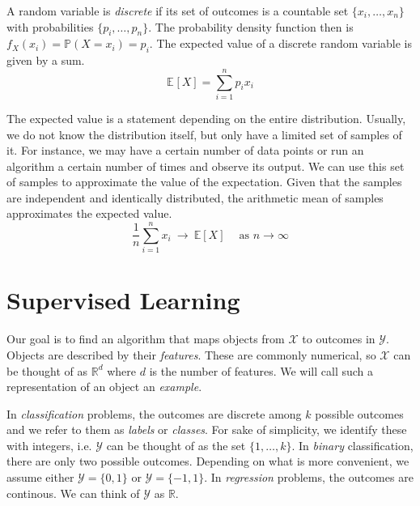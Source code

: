 \documentclass[
	twoside=false, %
]{kaobook}
\begin{document}
A random variable is \textit{discrete} if its set of outcomes is a countable set $\{ x_{i}, \dots, x_{n} \}$ with probabilities $\{ p_{i}, \dots, p_{n} \}$. The probability density function then is $f_X(x_i) = \mathbb{P}(X = x_i) = p_i$. The expected value of a discrete random variable is given by a sum.
$$
\mathbb{E}_{}\left[ X \right]  = \sum_{i=1}^n p_{i} x_{i}
$$

The expected value is a statement depending on the entire distribution. Usually, we do not know the distribution itself, but only have a limited set of samples of it. For instance, we may have a certain number of data points or run an algorithm a certain number of times and observe its output. We can use this set of samples to approximate the value of the expectation. Given that the samples are independent and identically distributed, the arithmetic mean of samples approximates the expected value.
$$
\frac{1}{n} \sum_{i=1}^n x_i ~ \rightarrow ~ \mathbb{E}\left[X\right]  ~ \hspace{1em} \text{as $n \to \infty$}
$$


\section{Supervised Learning}
\label{sec:supervised-learning}

Our goal is to find an algorithm that maps objects from $\mathcal{X}$ to outcomes in $\mathcal{Y}$. Objects
are described by their \textit{features}. These are commonly numerical, so $\mathcal{X}$ can be thought of as $\mathbb{R}^d$ where $d$ is the number of features. We will call such a representation of an object an \textit{example}.

In \textit{classification} problems, the outcomes are discrete among $k$ possible outcomes and we refer to them as \textit{labels} or \textit{classes}. For sake of simplicity, we identify these with integers, i.e. $\mathcal{Y}$ can be thought of as the set $\{ 1, \dots, k \}$. In \textit{binary} classification, there are only two possible outcomes. Depending on what is more convenient, we assume either $\mathcal{Y} = \{0,1\}$ or $\mathcal{Y} = \{-1, 1\}$.
In \textit{regression} problems, the outcomes are continous. We can think of $\mathcal{Y}$ as $\mathbb{R}$.
\end{document}
